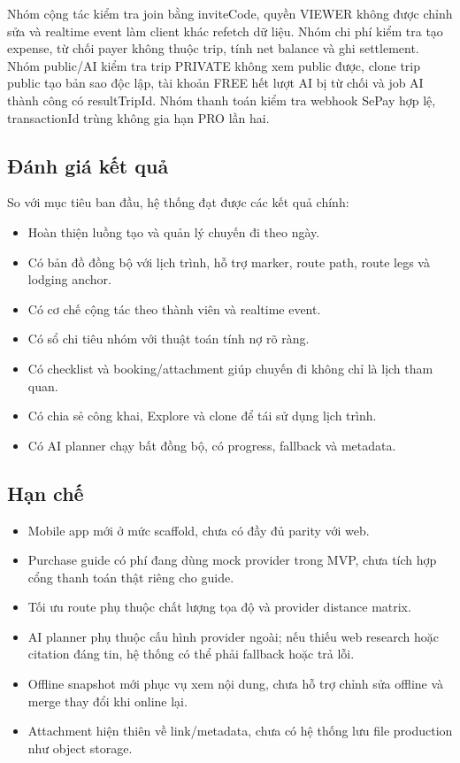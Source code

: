 \documentclass[a4paper]{report}
\begin{document}
Nhóm cộng tác kiểm tra join bằng inviteCode, quyền VIEWER không được chỉnh sửa và realtime event làm client khác refetch dữ liệu. Nhóm chi phí kiểm tra tạo expense, từ chối payer không thuộc trip, tính net balance và ghi settlement. Nhóm public/AI kiểm tra trip PRIVATE không xem public được, clone trip public tạo bản sao độc lập, tài khoản FREE hết lượt AI bị từ chối và job AI thành công có resultTripId. Nhóm thanh toán kiểm tra webhook SePay hợp lệ, transactionId trùng không gia hạn PRO lần hai.

\subsection{Đánh giá kết quả}

So với mục tiêu ban đầu, hệ thống đạt được các kết quả chính:

\begin{itemize}
  \item Hoàn thiện luồng tạo và quản lý chuyến đi theo ngày.
  \item Có bản đồ đồng bộ với lịch trình, hỗ trợ marker, route path, route legs và lodging anchor.
  \item Có cơ chế cộng tác theo thành viên và realtime event.
  \item Có sổ chi tiêu nhóm với thuật toán tính nợ rõ ràng.
  \item Có checklist và booking/attachment giúp chuyến đi không chỉ là lịch tham quan.
  \item Có chia sẻ công khai, Explore và clone để tái sử dụng lịch trình.
  \item Có AI planner chạy bất đồng bộ, có progress, fallback và metadata.
\end{itemize}

\subsection{Hạn chế}

\begin{itemize}
  \item Mobile app mới ở mức scaffold, chưa có đầy đủ parity với web.
  \item Purchase guide có phí đang dùng mock provider trong MVP, chưa tích hợp cổng thanh toán thật riêng cho guide.
  \item Tối ưu route phụ thuộc chất lượng tọa độ và provider distance matrix.
  \item AI planner phụ thuộc cấu hình provider ngoài; nếu thiếu web research hoặc citation đáng tin, hệ thống có thể phải fallback hoặc trả lỗi.
  \item Offline snapshot mới phục vụ xem nội dung, chưa hỗ trợ chỉnh sửa offline và merge thay đổi khi online lại.
  \item Attachment hiện thiên về link/metadata, chưa có hệ thống lưu file production như object storage.
\end{itemize}
\end{document}
